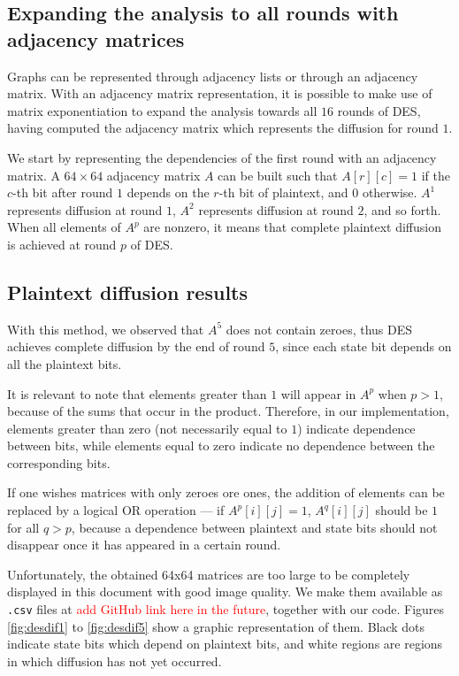 \documentclass{report}
\begin{document}
\subsection{Expanding the analysis to all rounds with adjacency matrices}
Graphs can be represented through adjacency lists or through an adjacency matrix. With an adjacency matrix representation, it is possible to make use of matrix exponentiation to expand the analysis towards all $16$ rounds of DES, having computed the adjacency matrix which represents the diffusion for round $1$. 

We start by representing the dependencies of the first round with an adjacency matrix. A $64\times64$ adjacency matrix $A$ can be built such that $A[r][c] = 1$ if the $c$-th bit after round $1$ depends on the $r$-th bit of plaintext, and $0$ otherwise. $A^1$ represents diffusion at round $1$, $A^2$ represents diffusion at round $2$, and so forth. When all elements of $A^p$ are nonzero, it means that complete plaintext diffusion is achieved at round $p$ of DES.

\subsection{Plaintext diffusion results}\label{sec:figs}

With this method, we observed that $A^5$ does not contain zeroes, thus DES achieves complete diffusion by the end of round $5$, since each state bit depends on all the plaintext bits.

It is relevant to note that elements greater than $1$ will appear in $A^p$ when $p > 1$, because of the sums that occur in the product. Therefore, in our implementation, elements greater than zero (not necessarily equal to $1$) indicate dependence between bits, while elements equal to zero indicate no dependence between the corresponding bits.

If one wishes matrices with only zeroes ore ones, the addition of elements can be replaced by a logical OR operation --- if $A^p[i][j] = 1$, $A^q[i][j]$ should be $1$ for all $q > p$, because a dependence between plaintext and state bits should not disappear once it has appeared in a certain round.

Unfortunately, the obtained 64x64 matrices are too large to be completely displayed in this document with good image quality. We make them available as \texttt{.csv} files at \textcolor{red}{add GitHub link here in the future}, together with our code. Figures \ref{fig:desdif1} to \ref{fig:desdif5} show a graphic representation of them. Black dots indicate state bits which depend on plaintext bits, and white regions are regions in which diffusion has not yet occurred.
\end{document}
